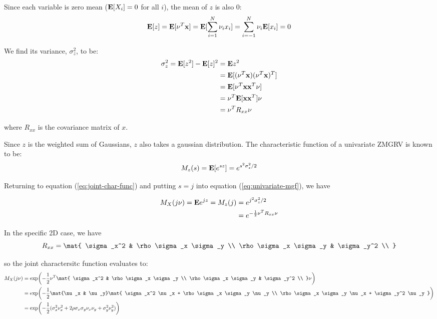 \documentclass{homework}
\begin{document}
Since each variable is zero mean (${\bf E}[X_i] = 0$ for all $i$),
the mean of $z$ is also 0:
\begin{equation*}
    {\bf E}[z] = {\bf E}[\nu^T {\bf x}] = {\bf E}[\sum_{i=1}^N \nu_i x_i]
        = \sum_{i=-1}^{N} \nu_i {\bf E}[x_i] = 0
\end{equation*}

We find its variance, $\sigma_z^2$, to be:
\begin{align*}
    \sigma_z^2 = {\bf E}[z^2] - {\bf E}[z]^2 &= {\bf E}{z^2} \\
        &= {\bf E}[(\nu^T {\bf x}) (\nu^T {\bf x})^T] \\
        &= {\bf E}[\nu^T {\bf x} {\bf x}^T \nu] \\
        &= \nu^T {\bf E}[{\bf x} {\bf x}^T] \nu \\
        &= \nu^T R_{xx} \nu
\end{align*}

where $R_{xx}$ is the covariance matrix of $x$.

Since $z$ is the weighted sum of Gaussians, $z$ also takes a gaussian distribution.
The characteristic function of a univariate ZMGRV is known to be:
\begin{equation}
    M_z(s) = {\bf E}[e^{sz}]= e^{s^2 \sigma_z^2 / 2}
    \label{eq:univariate-mgf}
\end{equation}

Returning to equation (\ref{eq:joint-char-func}) and putting $s=j$ into equation
(\ref{eq:univariate-mgf}), we have

\begin{align*}
    M_X(j \nu) = {\bf E}{e^{j z}} = M_z(j) &= e^{j^2 \sigma_z^2 / 2} \\
        &= e^{-\frac{1}{2} \nu^T R_{xx} \nu}
\end{align*}

In the specific 2D case, we have
\begin{equation*}
    R_{xx} = \mat{
        \sigma_x^2 & \rho \sigma_x \sigma_y \\
        \rho \sigma_x \sigma_y  & \sigma_y^2 \\
    }
\end{equation*}

so the joint charactersitc function evaluates to:
\begin{align*}
    M_X(j\nu) &= \exp \biggl(
        -\frac{1}{2} \nu^T \mat{
            \sigma_x^2 & \rho \sigma_x \sigma_y \\
            \rho \sigma_x \sigma_y  & \sigma_y^2 \\
        } \nu
    \biggr) \\
    &= \exp \biggl(
        -\frac{1}{2} \mat{\nu_x & \nu_y} \mat{
            \sigma_x^2 \nu_x + \rho \sigma_x \sigma_y \nu_y \\
            \rho \sigma_x \sigma_y \nu_x + \sigma_y^2 \nu_y
        }
    \biggr) \\
    &= \exp \biggl(
        -\frac{1}{2} (
            \sigma_x^2 \nu_x^2 + 2 \rho \sigma_x \sigma_y \nu_x \nu_y
            + \sigma_y^2 \nu_y^2
        )
    \biggr)
\end{align*}
\end{document}
